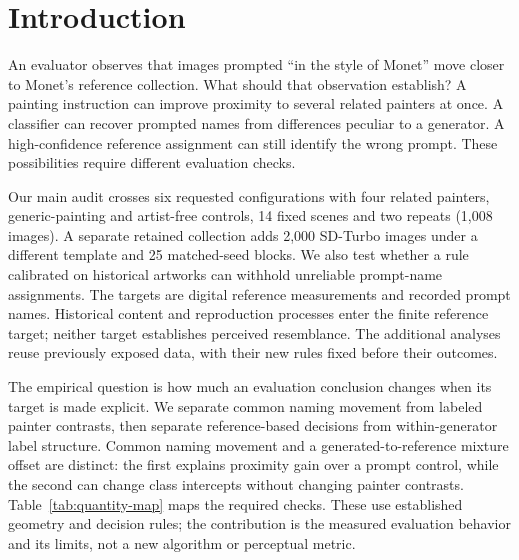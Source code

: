 \section{Introduction}
An evaluator observes that images prompted ``in the style of Monet'' move
closer to Monet's reference collection. What should that observation establish?
A painting instruction can improve proximity to several related painters at
once. A classifier can recover prompted names from differences peculiar to a
generator. A high-confidence reference assignment can still identify the wrong
prompt. These possibilities require different evaluation checks.

Our main audit crosses six requested configurations with four related painters,
generic-painting and artist-free controls, 14 fixed scenes and two repeats
(1,008 images). A separate retained collection adds 2,000 SD-Turbo images under
a different template and 25 matched-seed blocks. We also test whether a rule
calibrated on historical artworks can withhold unreliable prompt-name assignments.
The targets are digital reference measurements and recorded prompt names.
Historical content and reproduction processes enter the finite reference target;
neither target establishes perceived resemblance. The additional analyses reuse
previously exposed data, with their new rules fixed before their outcomes.

The empirical question is how much an evaluation conclusion changes when its
target is made explicit. We separate common naming movement from labeled painter
contrasts, then separate reference-based decisions from within-generator label
structure. Common naming movement and a generated-to-reference mixture offset
are distinct: the first explains proximity gain over a prompt control, while
the second can change class intercepts without changing painter contrasts.
Table~\ref{tab:quantity-map} maps the required checks. These use established
geometry and decision rules; the contribution is the measured evaluation
behavior and its limits, not a new algorithm or perceptual metric.

